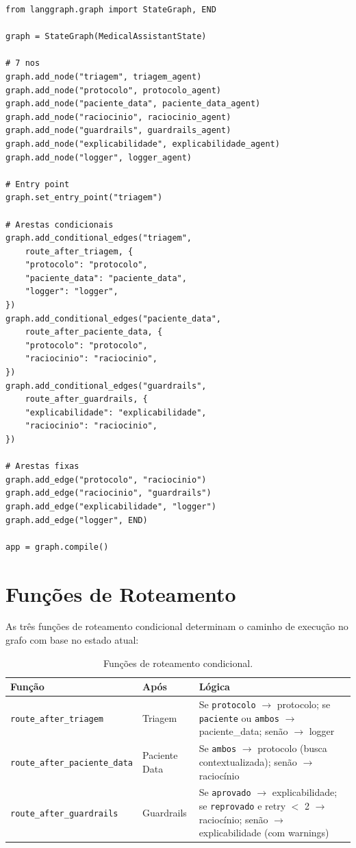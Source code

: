 \begin{lstlisting}[caption={Montagem do grafo em \texttt{src/flows/graph.py}.}]
from langgraph.graph import StateGraph, END

graph = StateGraph(MedicalAssistantState)

# 7 nos
graph.add_node("triagem", triagem_agent)
graph.add_node("protocolo", protocolo_agent)
graph.add_node("paciente_data", paciente_data_agent)
graph.add_node("raciocinio", raciocinio_agent)
graph.add_node("guardrails", guardrails_agent)
graph.add_node("explicabilidade", explicabilidade_agent)
graph.add_node("logger", logger_agent)

# Entry point
graph.set_entry_point("triagem")

# Arestas condicionais
graph.add_conditional_edges("triagem",
    route_after_triagem, {
    "protocolo": "protocolo",
    "paciente_data": "paciente_data",
    "logger": "logger",
})
graph.add_conditional_edges("paciente_data",
    route_after_paciente_data, {
    "protocolo": "protocolo",
    "raciocinio": "raciocinio",
})
graph.add_conditional_edges("guardrails",
    route_after_guardrails, {
    "explicabilidade": "explicabilidade",
    "raciocinio": "raciocinio",
})

# Arestas fixas
graph.add_edge("protocolo", "raciocinio")
graph.add_edge("raciocinio", "guardrails")
graph.add_edge("explicabilidade", "logger")
graph.add_edge("logger", END)

app = graph.compile()
\end{lstlisting}

\section{Funções de Roteamento}

As três funções de roteamento condicional determinam o caminho de execução no grafo com base no estado atual:

\begin{table}[H]
\centering
\caption{Funções de roteamento condicional.}
\label{tab:routing_functions}
\small
\begin{tabularx}{\textwidth}{l l X}
\toprule
\textbf{Função} & \textbf{Após} & \textbf{Lógica} \\
\midrule
\texttt{route\_after\_triagem} & Triagem & Se \texttt{protocolo} $\rightarrow$ protocolo; se \texttt{paciente} ou \texttt{ambos} $\rightarrow$ paciente\_data; senão $\rightarrow$ logger \\
\texttt{route\_after\_paciente\_data} & Paciente Data & Se \texttt{ambos} $\rightarrow$ protocolo (busca contextualizada); senão $\rightarrow$ raciocínio \\
\texttt{route\_after\_guardrails} & Guardrails & Se \texttt{aprovado} $\rightarrow$ explicabilidade; se \texttt{reprovado} e retry $<$ 2 $\rightarrow$ raciocínio; senão $\rightarrow$ explicabilidade (com warnings) \\
\bottomrule
\end{tabularx}
\end{table}

